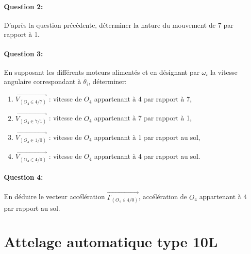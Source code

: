 \paragraph{Question 2:} D'après la question précédente, déterminer la nature du mouvement de 7 par rapport à 1.

\paragraph{Question 3:} En supposant les différents moteurs alimentés et en désignant par $\omega_{i}$ la vitesse angulaire correspondant à $\dot{\theta_i}$, déterminer:
\begin{enumerate}
 \item $\overrightarrow{V_{(O_4\in4/7)}}$ : vitesse de $O_4$ appartenant à 4 par rapport à 7,
 \item $\overrightarrow{V_{(O_4\in7/1)}}$ : vitesse de $O_4$ appartenant à 7 par rapport à 1,
 \item $\overrightarrow{V_{(O_4\in1/0)}}$ : vitesse de $O_4$ appartenant à 1 par rapport au sol,
 \item $\overrightarrow{V_{(O_4\in4/0)}}$ : vitesse de $O_4$ appartenant à 4 par rapport au sol.
\end{enumerate}

\paragraph{Question 4:} En déduire le vecteur accélération $\overrightarrow{\Gamma_{(O_4\in4/0)}}$, accélération de $O_4$ appartenant à 4 par rapport au sol.

\newpage

\section{Attelage automatique type 10L}

